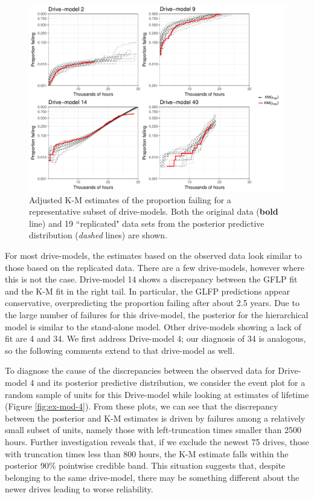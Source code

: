 \documentclass[11pt]{article}
\begin{document}
\begin{figure}
\includegraphics[width=\textwidth]{ppcheck-sample-v2}
\caption{\footnotesize Adjusted K-M estimates of the proportion failing for a representative subset of drive-models. Both the original data (\textbf{bold} line) and 19 ``replicated" data sets from the posterior predictive distribution (\textit{dashed} lines) are shown.}
\label{fig:post-pred-KM}
\end{figure}

For most drive-models, the estimates based on the observed data look similar to those based on the replicated data.  There are a few drive-models, however where this is not the case. Drive-model 14 shows a discrepancy between the GFLP fit and the K-M fit in the right tail. In particular, the GLFP predictions appear conservative, overpredicting the proportion failing after about 2.5 years. Due to the large number of failures for this drive-model, the posterior for the hierarchical model is similar to the stand-alone model. Other drive-models showing a lack of fit are 4 and 34. We first address Drive-model 4; our diagnosis of 34 is analogous, so the following comments extend to that drive-model as well.


To diagnose the cause of the discrepancies between the observed data for Drive-model 4 and its posterior predictive distribution, we consider the event plot for a random sample of units for this Drive-model while looking at estimates of lifetime (Figure \ref{fig:ex-mod-4}). From these plots, we can see that the discrepancy between the posterior and K-M estimates is driven by failures among a relatively small subset of units, namely those with left-truncation times smaller than 2500 hours. Further investigation reveals that, if we exclude the newest 75 drives, those with truncation times less than 800 hours, the K-M estimate falls within the posterior 90\% pointwise credible band. This situation suggests that, despite belonging to the same drive-model, there may be something different about the newer drives leading to worse reliability. 
\end{document}
